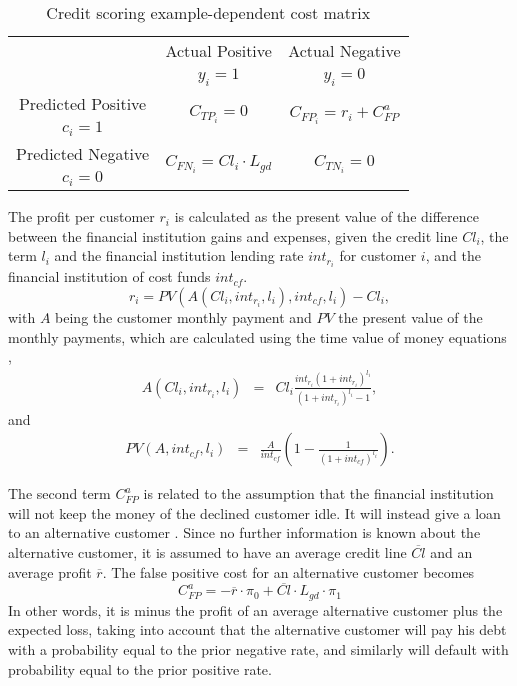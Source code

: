   \begin{table}
  \centering
  \footnotesize
    \begin{tabular}{c|c|c}
      \multicolumn{1}{c|}{}  & Actual Positive& Actual Negative \\
      \multicolumn{1}{c|}{} & $y_i=1$& $y_i=0$ \\
      \hline
      Predicted Positive& \multirow{ 2}{*}{$C_{TP_i}=0$} & \multirow{2}{*}{$C_{FP_i}=r_i+C^a_{FP}$} 
      \\
      $c_i=1$ & &\\
      \hline
      Predicted Negative& \multirow{ 2}{*}{$C_{FN_i}=Cl_i \cdot L_{gd}$} & \multirow{
      2}{*}{$C_{TN_i}=0$} \\
      $c_i=0$ & &\\
    \end{tabular}
  \caption{Credit scoring example-dependent cost matrix}
  \label{tab:4:costmat2}
  \end{table}
  
  The profit per customer $r_i$ is calculated as the present value of the difference between the 
  financial institution gains and expenses, given the credit line $Cl_i$, the term $l_i$ and the 
  financial institution lending rate $int_{r_i}$ for customer $i$, and the financial institution 
  of cost funds $int_{cf}$.
  \begin{equation}
    r_i= PV(A(Cl_i,int_{r_i},l_i),int_{cf},l_i)-Cl_i,
  \end{equation}
  with $A$ being the customer monthly payment and $PV$ the present value of the monthly payments,
  which are calculated using the time value of money equations \citep{Lawrence2012},
  \begin{eqnarray}
    A(Cl_i,int_{r_i},l_i) &=&  Cl_i \frac{int_{r_i}(1+int_{r_i})^{l_i}}{(1+int_{r_i})^{l_i}-1},
  \end{eqnarray}
  and 
  \begin{eqnarray}
    PV(A,int_{cf},l_i) &=& \frac{A}{int_{cf}} \left(1-\frac{1}{(1+int_{cf})^{l_i}} \right).
  \end{eqnarray}
    
  The second term $C^a_{FP}$ is related to the assumption that the financial institution will not 
  keep the money of the declined customer idle. It will instead give a loan to an alternative 
  customer \citep{Nayak1997}. Since no further information is known about the alternative customer, 
  it is assumed to have an average credit line $\overline{Cl}$ and an average profit $\overline{r}$.
  The false positive cost for an alternative customer becomes 
  \begin{equation}
    C^a_{FP}=- \overline{r} \cdot \pi_0+\overline{Cl}\cdot L_{gd} \cdot \pi_1
  \end{equation}
  In other words, it is minus the profit of an average alternative customer plus the expected loss, 
  taking into account that the alternative customer will pay his debt with a probability equal to 
  the prior negative rate, and similarly will default with probability equal to the prior positive 
  rate.

